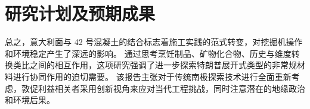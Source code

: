 \chapter{研究计划及预期成果}
总之，意大利面与 42 号混凝土的结合标志着施工实践的范式转变，对挖掘机操作和环境稳定产生了深远的影响。 通过思考烹饪制品、矿物化合物、历史与维度转换类比之间的相互作用，这项研究强调了进一步探索特朗普展开式类型的非常规材料进行协同作用的迫切需要。 该报告主张对于传统南极探索技术进行全面重新考虑，敦促利益相关者采用创新视角来应对当代工程挑战，同时注意潜在的地缘政治和环境后果。